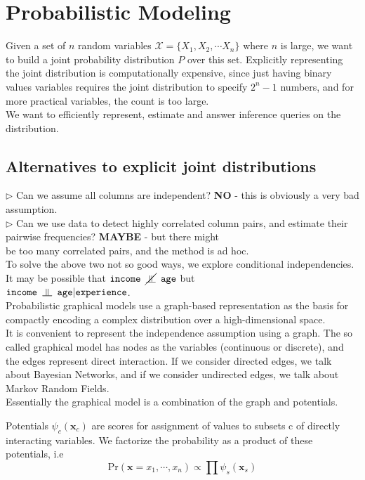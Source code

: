 \section{Probabilistic Modeling}
Given a set of $n$ random variables $\mathcal{X} = \{X_1, X_2, \cdots X_n\}$ where $n$ is large, we want to build a joint probability distribution $P$ over this set. Explicitly representing the joint distribution is computationally expensive, since just having binary values variables requires the joint distribution to specify $2^n-1$ numbers, and for more practical variables, the count is too large. \\
We want to efficiently represent, estimate and answer inference queries on the distribution.
\subsection{Alternatives to explicit joint distributions}
$\triangleright$ Can we assume all columns are independent? \textbf{NO} - this is obviously a very bad assumption. \\
\noindent$\triangleright$ Can we use data to detect highly correlated column pairs, and estimate their pairwise frequencies? \textbf{MAYBE} - but there might\\\noindent be too many correlated pairs, and the method is ad hoc.\\
\noindent To solve the above two not so good ways, we explore conditional independencies. It may be possible that $\texttt{income } \cancel{\ind} \texttt{ age}$ but \\\noindent$\texttt{income } {\ind} \texttt{ age}|\texttt{experience}$. \\
Probabilistic graphical models use a graph-based representation as the basis for compactly
encoding a complex distribution over a high-dimensional space. \\
It is convenient to represent the independence assumption using a graph. The so called graphical model has nodes as the variables (continuous or discrete), and the edges represent direct interaction. If we consider directed edges, we talk about Bayesian Networks, and if we consider undirected edges, we talk about Markov Random Fields. \\
Essentially the graphical model is a combination of the graph and potentials.
\begin{defn}[Potentials]
Potentials $\psi_c(\mathbf x_c)$ are scores for assignment of values to subsets c of directly
interacting variables. We factorize the probability as a product of these potentials, i.e
\begin{equation}
	\text{Pr}(\mathbf x = x_1, \cdots, x_n) \propto \prod \psi_s(\mathbf x_s)
\end{equation}
\end{defn}


